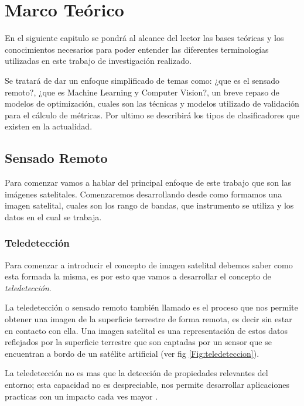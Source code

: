 \chapter{Marco Teórico} \label{chap:marcoteorico}

En el siguiente capitulo se pondrá al alcance del lector las bases teóricas y los conocimientos necesarios para poder entender las diferentes terminologías utilizadas en este trabajo de investigación realizado.

Se tratará de dar un enfoque simplificado de temas como: ¿que es el sensado remoto?, ¿que es Machine Learning y Computer Vision?, un breve repaso de modelos de optimización, cuales son las técnicas y modelos utilizado de validación para el cálculo de métricas. 
Por ultimo se describirá los tipos de clasificadores que existen en la actualidad.

\section{Sensado Remoto}\label{sec:sensadoremoto}

Para comenzar vamos a hablar del principal enfoque de este trabajo que son las imágenes satelitales. Comenzaremos desarrollando desde como formamos una imagen satelital, cuales son los rango de bandas, que instrumento se utiliza y los datos en el cual se trabaja.

\subsection{Teledetección}\label{sub:teledeteccion}

Para comenzar a introducir el concepto de imagen satelital debemos saber como esta formada la misma, es por esto que vamos a desarrollar el concepto de \textit{teledetección}.

La teledetección o sensado remoto también llamado es el proceso que nos permite obtener una imagen de la superficie terrestre de forma remota, es decir sin estar en contacto con ella. Una imagen satelital es una representación de estos datos reflejados por la superficie terrestre que son captadas por un sensor que se encuentran a bordo de un satélite artificial (ver fig \ref{Fig:teledeteccion}).

La teledetección no es mas que la detección de propiedades relevantes del entorno; esta capacidad no es despreciable, nos permite desarrollar aplicaciones practicas con un impacto cada ves mayor \citep{percepcion}. 

